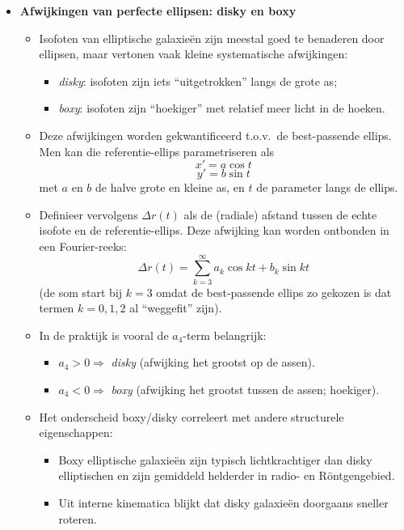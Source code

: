 \documentclass[10pt,a4paper]{article}
\renewenvironment{equation}{\begin{equation*}}{\end{equation*}}
\begin{document}
\begin{itemize}
  \item \textbf{Afwijkingen van perfecte ellipsen: disky en boxy}

\begin{itemize}
  \item Isofoten van elliptische galaxieën zijn meestal goed te benaderen door ellipsen, maar vertonen vaak kleine systematische afwijkingen:
  \begin{itemize}
    \item \textit{disky}: isofoten zijn iets ``uitgetrokken'' langs de grote as;
    \item \textit{boxy}: isofoten zijn ``hoekiger'' met relatief meer licht in de hoeken.
  \end{itemize}

  \item Deze afwijkingen worden gekwantificeerd t.o.v.\ de best-passende ellips. Men kan die referentie-ellips parametriseren als
  \begin{equation}
    x' = a\cos t
    \tag{2.54}
  \end{equation}
  \begin{equation}
    y' = b\sin t
    \tag{2.55}
  \end{equation}
  met $a$ en $b$ de halve grote en kleine as, en $t$ de parameter langs de ellips.

  \item Definieer vervolgens $\Delta r(t)$ als de (radiale) afstand tussen de echte isofote en de referentie-ellips. Deze afwijking kan worden ontbonden in een Fourier-reeks:
  \begin{equation}
    \Delta r(t) = \sum_{k=3}^{\infty} a_k\cos kt + b_k\sin kt
    \tag{2.56}
  \end{equation}
  (de som start bij $k=3$ omdat de best-passende ellips zo gekozen is dat termen $k=0,1,2$ al ``weggefit'' zijn).

  \item In de praktijk is vooral de $a_4$-term belangrijk:
  \begin{itemize}
    \item $a_4>0 \Rightarrow$ \textit{disky} (afwijking het grootst op de assen).
    \item $a_4<0 \Rightarrow$ \textit{boxy} (afwijking het grootst tussen de assen; hoekiger).
  \end{itemize}

  \item Het onderscheid boxy/disky correleert met andere structurele eigenschappen:
  \begin{itemize}
    \item Boxy elliptische galaxieën zijn typisch lichtkrachtiger dan disky elliptischen en zijn gemiddeld helderder in radio- en Röntgengebied.
    \item Uit interne kinematica blijkt dat disky galaxieën doorgaans sneller roteren.
  \end{itemize}


\end{itemize}
\end{itemize}
\end{document}
